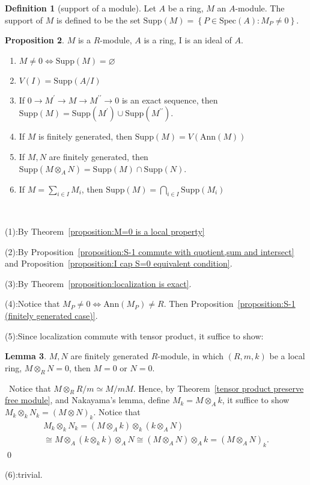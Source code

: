 \documentclass[a4paper,12pt]{article}
\newenvironment{prooff}{{\noindent\it\textcolor{cyan!40!black}{Proof}:}\,}{\par}
\newenvironment{proofff}{{\noindent\it\textcolor{cyan!40!black}{Proof of the lemma}:}\,}{\qed \par}
\newcommand{\bbrace}[1]{\left\{ #1 \right\} }
\newcommand{\p}{^{\prime}}
\newcommand{\spec}[1]{\text{Spec}({#1})}
\theoremstyle{definition}
\newtheorem{defn}{Definition}[subsection]
\newtheorem{lem}[defn]{Lemma}
\newtheorem{prop}[defn]{Proposition}
\begin{document}
\begin{defn}[support of a module]
    Let $A$ be a ring, $M$ an $A$-module. The support of $M$ is defined to be the set $\text{Supp}(M)=\bbrace{P\in \spec{A}: M_P\neq 0}$.
\end{defn}
\begin{prop}
    $M$ is a $R$-module, $A$ is a ring, I is an ideal of $A$.
    \begin{enumerate}[(1)]
        \item $M\neq 0 \Leftrightarrow \text{Supp}(M)=\varnothing$
        \item $V(I) = \text{Supp} (A/I)$
        \item If $0\rightarrow M\p \rightarrow M\rightarrow M^{\prime\prime} \rightarrow 0$  is an exact sequence, then $\text{Supp}(M)= \text{Supp}(M\p)\cup \text{Supp} (M^{\prime\prime})$.
        \item If $M$ is finitely generated, then $\text{Supp}(M)=V(\text{Ann}(M))$
        \item If $M,N$ are finitely generated, then $\text{Supp}(M\otimes_A N)=\text{Supp}(M)\cap \text{Supp}(N)$.
        \item If $M=\sum_{i\in I }M_i$, then $\text{Supp}(M)=\bigcap_{i\in I}\text{Supp}(M_i)$
    \end{enumerate}
\end{prop}
\begin{prooff}

    (1):By Theorem~\ref{proposition:M=0 is a local property}

    (2):By Proposition~\ref{proposition:S-1 commute with quotient,sum and intersect} and Proposition~\ref{proposition:I cap S=0 equivalent condition}.

    (3):By Theorem~\ref{proposition:localization is exact}.

    (4):Notice that $M_P\neq 0\Leftrightarrow \text{Ann}(M_P)\neq R$. Then Proposition~\ref{proposition:S-1 (finitely generated case)}.

    (5):Since localization commute with tensor product, it suffice to show:
    \begin{lem}
        $M,N$ are finitely generated $R$-module, in which $(R,m,k)$ be a local ring, $M\otimes_R N=0$, then $M=0$ or $N=0$.
    \end{lem}
    \begin{proofff}
        Notice that $M\otimes_R R/m\simeq M/mM$. Hence, by Theorem~\ref{tensor product preserve free module}, and Nakayama's lemma, define $M_k=M\otimes_A k$, it suffice to show $M_k\otimes_k N_k=(M\otimes N)_k$. Notice that
        $$
            \begin{gathered}
                M_k \otimes_k N_k=\left(M \otimes_A k\right) \otimes_k\left(k \otimes_A N\right) \\
                \cong M \otimes_A\left(k \otimes_k k\right) \otimes_A N \cong\left(M \otimes_A N\right) \otimes_A k=\left(M \otimes_A N\right)_k .
            \end{gathered}
        $$
    \end{proofff}

    (6):trivial.
\end{prooff}
\end{document}
